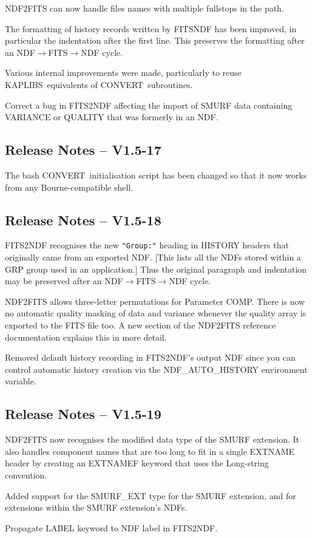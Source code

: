 \documentclass[twoside,11pt]{article}
\newcommand{\htmlref}[2]{#1}
\newcommand{\xref}[3]{#1}
\newcommand{\CONVERT}{{\footnotesize CONVERT}}
\newcommand{\KAPLIBS}{{\footnotesize KAPLIBS}}
\newcommand{\KAPLIBSref}{\xref{\KAPLIBS}{sun238}{}}
\begin{document}
NDF2FITS can now handle files names with multiple fullstops in the 
path.

The formatting of history records written by FITSNDF has been
improved, in particular the indentation after the first line. This
preserves the formatting after an NDF$\rightarrow$FITS$\rightarrow$NDF cycle.

Various internal improvements were made, particularly to reuse
\KAPLIBSref\ equivalents of \CONVERT\ subroutines.

Correct a bug in \htmlref{FITS2NDF}{FITS2NDF} affecting the import of
SMURF data containing VARIANCE or QUALITY that was formerly in an NDF.

\subsection{Release Notes -- V1.5-17}

The bash \CONVERT\ initialisation script has been changed so that it
now works from any Bourne-compatible shell.

\subsection{Release Notes -- V1.5-18}

\htmlref{FITS2NDF}{FITS2NDF} recognises the new {\tt "Group:"} heading
in HISTORY headers that originally came from an exported NDF.  [This
lists all the NDFs stored within a GRP group used in an application.]
Thus the original paragraph and indentation may be preserved after an
NDF$\rightarrow$FITS$\rightarrow$NDF cycle.

\htmlref{NDF2FITS}{NDF2FITS} allows three-letter permutations for 
Parameter COMP.  There is now no automatic quality masking of data 
and variance whenever the quality array is exported to the FITS file 
too.  A new section of the NDF2FITS reference documentation explains
this in more detail.

Removed default history recording in FITS2NDF's output NDF since 
you can control automatic history creation via the 
\xref{NDF\_AUTO\_HISTORY}{sun33}{preparing_to_record_history_information}
environment variable.

\subsection{Release Notes -- V1.5-19}

\htmlref{NDF2FITS}{NDF2FITS} now recognises the modified data type of
the SMURF extension. It also handles component names that are too long
to fit in a single EXTNAME header by creating an EXTNAMEF keyword that
uses the Long-string convention.

Added support for the SMURF\_EXT type for the SMURF extension, and for
extensions within the SMURF extension's NDFs.

Propagate LABEL keyword to NDF label in \htmlref{FITS2NDF}{FITS2NDF}.
\end{document}
